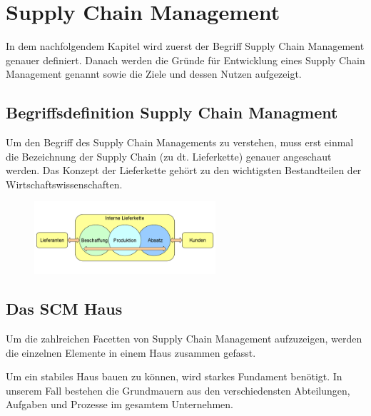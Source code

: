 \chapter{Supply Chain Management}
In dem nachfolgendem Kapitel wird zuerst der Begriff Supply Chain Management genauer definiert. Danach werden die Gründe für Entwicklung eines Supply Chain Management genannt sowie die Ziele und dessen Nutzen aufgezeigt.

\section{Begriffsdefinition Supply Chain Managment}
Um den Begriff des Supply Chain Managements zu verstehen, muss erst einmal die Bezeichnung der Supply Chain (zu dt. Lieferkette) genauer angeschaut werden.
Das Konzept der Lieferkette gehört zu den wichtigsten Bestandteilen der Wirtschaftswissenschaften.

\begin{figure}[h]
	\centering
	\includegraphics[width=0.6\textwidth]{../pics/Lieferkette}
\end{figure}

\section{Das SCM Haus}
Um die zahlreichen Facetten von Supply Chain Management aufzuzeigen, werden die einzelnen Elemente in einem Haus zusammen gefasst.

Um ein stabiles Haus bauen zu können, wird starkes Fundament benötigt. In unserem Fall bestehen die Grundmauern aus den verschiedensten Abteilungen, Aufgaben und Prozesse im gesamtem Unternehmen.
